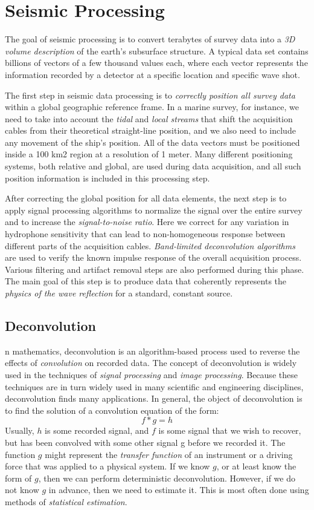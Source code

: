 \documentclass[twocolumn]{article}
\begin{document}
\section{Seismic Processing}
The goal of seismic processing is to convert terabytes of survey data into a \emph{3D volume description} of the earth's subsurface structure. A typical data set contains billions of vectors of a few thousand values each, where each vector represents the information recorded by a detector at a specific location and specific wave shot.

The first step in seismic data processing is to \emph{correctly position all survey data} within a global geographic reference frame. In a marine survey, for instance, we need to take into account the \emph{tidal} and \emph{local streams} that shift the acquisition cables from their theoretical straight-line position, and we also need to
include any movement of the ship's position. All of the data vectors must be positioned inside a 100 km2 region at a resolution of 1 meter. Many different positioning systems, both relative and global, are used during data acquisition, and all such position information is included in this processing step.

After correcting the global position for all data elements, the next step is to apply signal processing algorithms to normalize the signal over the entire survey and to increase the \emph{signal-to-noise ratio}. Here we correct for any variation in hydrophone sensitivity that can lead to non-homogeneous response between different parts of the acquisition cables. \emph{Band-limited deconvolution algorithms} are used to verify the known impulse response of the overall acquisition process. Various filtering and artifact removal steps are also performed during this phase. The main goal of this step is to produce data that coherently represents the \emph{physics of the wave reflection} for a standard, constant source.

\subsection{Deconvolution}
n mathematics, deconvolution is an algorithm-based process used to reverse the effects of \textit{convolution} on recorded data.
The concept of deconvolution is widely used in the techniques of \textit{signal processing} and \textit{image processing}. 
Because these techniques are in turn widely used in many scientific and engineering disciplines, deconvolution finds many applications.
In general, the object of deconvolution is to find the solution of a convolution equation of the form:
$$ f * g = h$$
Usually, $h$ is some recorded signal, and $f$ is some signal that we wish to recover, but has been convolved with some other signal g before we recorded it. 
The function $g$ might represent the \textit{transfer function} of an instrument or a driving force that was applied to a physical system. If we know $g$, or at least know the form of $g$, then we can perform deterministic deconvolution. However, if we do not know $g$ in advance, then we need to estimate it. This is most often done using methods of \textit{statistical estimation}.
\end{document}
